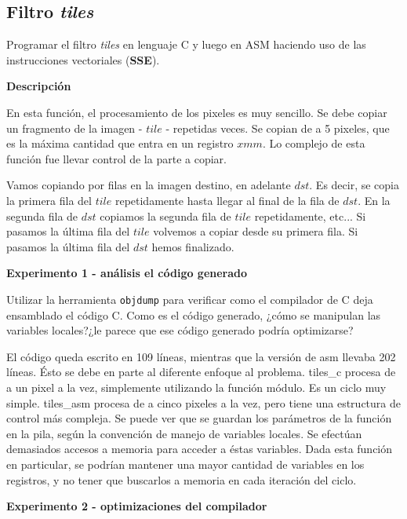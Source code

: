 \subsection*{Filtro \textit{tiles}}

Programar el filtro \textit{tiles} en lenguaje C y luego en ASM haciendo uso de las instrucciones vectoriales (\textbf{SSE}).
    

\vspace*{0.3cm} \noindent
\textbf{Descripción}

En esta función, el procesamiento de los pixeles es muy sencillo. Se debe copiar un fragmento de la imagen - $tile$  - repetidas veces. Se copian de a 5 
pixeles, que es la máxima cantidad que entra en un registro $xmm$. Lo complejo de esta función fue llevar control de la parte a copiar.

Vamos copiando por filas en la imagen destino, en adelante $dst$. Es decir, se copia la primera fila del $tile$ repetidamente hasta llegar al
final de la fila de $dst$. En la segunda fila de $dst$ copiamos la segunda fila de $tile$ repetidamente, etc...
Si pasamos la última fila del $tile$ volvemos a copiar desde su primera fila. Si pasamos la última fila del $dst$ hemos finalizado.


\vspace*{0.3cm} \noindent
\textbf{Experimento 1 - análisis el código generado}

Utilizar la herramienta \verb|objdump| para verificar como el compilador de C deja ensamblado el código C. Como es el código generado, ¿cómo se manipulan las variables locales?¿le parece que ese código generado podría optimizarse?

\hruler

El código queda escrito en 109 líneas, mientras que la versión de asm llevaba 202 líneas. Ésto se debe en parte al diferente enfoque al problema.
tiles\_c procesa de a un pixel a la vez, simplemente utilizando la función módulo. Es un ciclo muy simple. tiles\_asm procesa de a cinco pixeles
a la vez, pero tiene una estructura de control más compleja.
Se puede ver que se guardan los parámetros de la función en la pila, según la convención de manejo de variables locales. Se efectúan demasiados
accesos a memoria para acceder a éstas variables.
Dada esta función en particular, se podrían mantener una mayor cantidad de variables en los registros, y no tener que buscarlos a memoria en cada
iteración del ciclo.


\newpage
\vspace*{0.3cm} \noindent
\textbf{Experimento 2 - optimizaciones del compilador}

